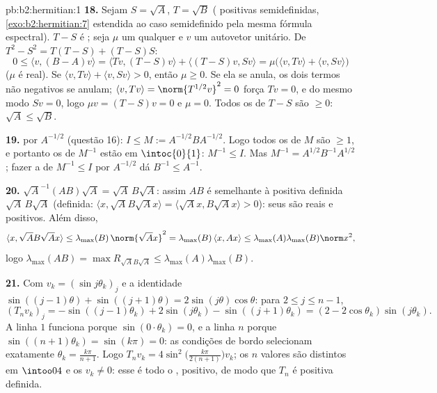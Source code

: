 \begin{solution}{pb:b2:hermitian:1}
\textbf{18.} Sejam $S = \sqrt A$, $T = \sqrt B$ (
positivas semidefinidas, \cref{exo:b2:hermitian:7} estendida ao caso
semidefinido pela mesma fórmula espectral). $T - S$ é
; seja $\mu$ um  qualquer e $v$ um autovetor unitário.
De $T^2 - S^2 = T(T - S) + (T - S)S$:
\[
0 \leq \langle v, (B - A)v\rangle
= \langle Tv, (T-S)v\rangle + \langle (T-S)v, Sv\rangle
= \mu\bigl(\langle v, Tv\rangle + \langle v,
Sv\rangle\bigr)
\]
($\mu$ é real). Se $\langle v, Tv\rangle + \langle v,
Sv\rangle > 0$, então $\mu \geq 0$. Se ela se anula, os dois
termos não negativos se anulam; $\langle v, Tv\rangle =
\norm{T^{1/2}v}^2 = 0$ força $Tv = 0$, e do mesmo modo $Sv = 0$, logo
$\mu v = (T - S)v = 0$ e $\mu = 0$. Todos os  de $T -
S$ são $\geq 0$: $\sqrt A \leq \sqrt B$.

\textbf{19.}  por $A^{-1/2}$ (questão 16): $I \leq M
:= A^{-1/2}BA^{-1/2}$. Logo todos os  de $M$ são $\geq 1$,
e portanto os de $M^{-1}$ estão em $\intoc{0}{1}$: $M^{-1} \leq I$.
Mas $M^{-1} = A^{1/2}B^{-1}A^{1/2}$; fazer a  de $M^{-1} \leq
I$ por $A^{-1/2}$ dá $B^{-1} \leq A^{-1}$.

\textbf{20.} $\sqrt A^{-1}(AB)\sqrt A = \sqrt A\,B\sqrt A$: assim
$AB$ é semelhante à  positiva definida $\sqrt
A\,B\sqrt A$ (definida: $\langle x, \sqrt AB\sqrt Ax\rangle =
\langle \sqrt Ax, B\sqrt Ax\rangle > 0$): seus  são
reais e positivos. Além disso,
\[
\langle x, \sqrt AB\sqrt Ax\rangle
\leq \lambda_{\max}(B)\,\norm{\sqrt Ax}^2
= \lambda_{\max}(B)\,\langle x, Ax\rangle
\leq \lambda_{\max}(A)\lambda_{\max}(B)\norm x^2 ,
\]
logo $\lambda_{\max}(AB) = \max R_{\sqrt AB\sqrt A} \leq
\lambda_{\max}(A)\lambda_{\max}(B)$.

\textbf{21.} Com $v_k = (\sin j\theta_k)_j$ e a identidade
$\sin((j-1)\theta) + \sin((j+1)\theta) =
2\sin(j\theta)\cos\theta$: para $2 \leq j \leq n-1$,
\[
(T_nv_k)_j = -\sin((j{-}1)\theta_k) + 2\sin(j\theta_k) -
\sin((j{+}1)\theta_k)
= (2 - 2\cos\theta_k)\sin(j\theta_k) .
\]
A linha $1$ funciona porque $\sin(0\cdot\theta_k) = 0$, e a linha $n$
porque $\sin((n+1)\theta_k) = \sin(k\pi) = 0$: as condições de bordo
selecionam exatamente $\theta_k = \frac{k\pi}{n+1}$. Logo
$T_nv_k = 4\sin^2\bigl(\frac{k\pi}{2(n+1)}\bigr)v_k$; os $n$
valores são distintos em $\intoo04$ e os $v_k \neq 0$: esse é
todo o , positivo, de modo que $T_n$ é positiva definida.


\end{solution}
